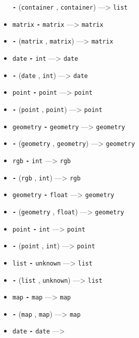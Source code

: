 \documentclass[]{book}
\theoremstyle{definition}
\theoremstyle{definition}
\theoremstyle{definition}
\theoremstyle{remark}
\begin{document}
\begin{itemize}
  \textbf{\texttt{-}} (\texttt{container} , \texttt{container})
  ---\textgreater{} \texttt{list}
\item
  \texttt{matrix} \textbf{\texttt{-}} \texttt{matrix} ---\textgreater{}
  \texttt{matrix}
\item
  \textbf{\texttt{-}} (\texttt{matrix} , \texttt{matrix})
  ---\textgreater{} \texttt{matrix}
\item
  \texttt{date} \textbf{\texttt{-}} \texttt{int} ---\textgreater{}
  \texttt{date}
\item
  \textbf{\texttt{-}} (\texttt{date} , \texttt{int}) ---\textgreater{}
  \texttt{date}
\item
  \texttt{point} \textbf{\texttt{-}} \texttt{point} ---\textgreater{}
  \texttt{point}
\item
  \textbf{\texttt{-}} (\texttt{point} , \texttt{point})
  ---\textgreater{} \texttt{point}
\item
  \texttt{geometry} \textbf{\texttt{-}} \texttt{geometry}
  ---\textgreater{} \texttt{geometry}
\item
  \textbf{\texttt{-}} (\texttt{geometry} , \texttt{geometry})
  ---\textgreater{} \texttt{geometry}
\item
  \texttt{rgb} \textbf{\texttt{-}} \texttt{int} ---\textgreater{}
  \texttt{rgb}
\item
  \textbf{\texttt{-}} (\texttt{rgb} , \texttt{int}) ---\textgreater{}
  \texttt{rgb}
\item
  \texttt{geometry} \textbf{\texttt{-}} \texttt{float} ---\textgreater{}
  \texttt{geometry}
\item
  \textbf{\texttt{-}} (\texttt{geometry} , \texttt{float})
  ---\textgreater{} \texttt{geometry}
\item
  \texttt{point} \textbf{\texttt{-}} \texttt{int} ---\textgreater{}
  \texttt{point}
\item
  \textbf{\texttt{-}} (\texttt{point} , \texttt{int}) ---\textgreater{}
  \texttt{point}
\item
  \texttt{list} \textbf{\texttt{-}} \texttt{unknown} ---\textgreater{}
  \texttt{list}
\item
  \textbf{\texttt{-}} (\texttt{list} , \texttt{unknown})
  ---\textgreater{} \texttt{list}
\item
  \texttt{map} \textbf{\texttt{-}} \texttt{map} ---\textgreater{}
  \texttt{map}
\item
  \textbf{\texttt{-}} (\texttt{map} , \texttt{map}) ---\textgreater{}
  \texttt{map}
\item
  \texttt{date} \textbf{\texttt{-}} \texttt{date} ---\textgreater{}

\end{itemize}
\end{document}
